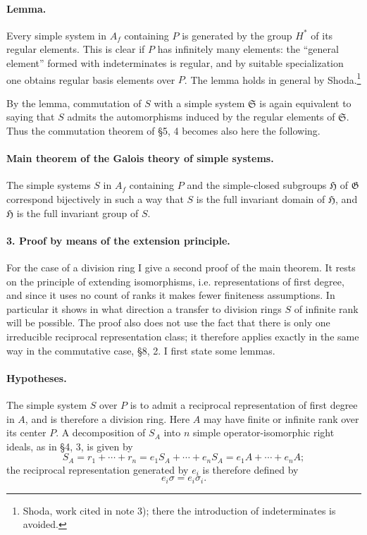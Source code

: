 \documentclass[11pt]{article}
\providecommand{\Gcal}{\mathfrak G}
\begin{document}
\paragraph{Lemma.}
Every simple system in \(A_f\) containing \(P\) is generated by the group \(H^*\) of its regular elements. This is clear if \(P\) has infinitely many elements: the “general element” formed with indeterminates is regular, and by suitable specialization one obtains regular basis elements over \(P\). The lemma holds in general by Shoda.\footnote{Shoda, work cited in note 3); there the introduction of indeterminates is avoided.}

By the lemma, commutation of \(S\) with a simple system \(\mathfrak S\) is again equivalent to saying that \(S\) admits the automorphisms induced by the regular elements of \(\mathfrak S\). Thus the commutation theorem of §5, 4 becomes also here the following.

\paragraph{Main theorem of the Galois theory of simple systems.}
The simple systems \(S\) in \(A_f\) containing \(P\) and the simple-closed subgroups \(\mathfrak H\) of \(\Gcal\) correspond bijectively in such a way that \(S\) is the full invariant domain of \(\mathfrak H\), and \(\mathfrak H\) is the full invariant group of \(S\).

\paragraph{3. Proof by means of the extension principle.}
For the case of a division ring I give a second proof of the main theorem. It rests on the principle of extending isomorphisms, i.e. representations of first degree, and since it uses no count of ranks it makes fewer finiteness assumptions. In particular it shows in what direction a transfer to division rings \(S\) of infinite rank will be possible. The proof also does not use the fact that there is only one irreducible reciprocal representation class; it therefore applies exactly in the same way in the commutative case, §8, 2. I first state some lemmas.

\paragraph{Hypotheses.}
The simple system \(S\) over \(P\) is to admit a reciprocal representation of first degree in \(A\), and is therefore a division ring. Here \(A\) may have finite or infinite rank over its center \(P\). A decomposition of \(S_A\) into \(n\) simple operator-isomorphic right ideals, as in §4, 3, is given by
\[
        S_A=r_1+\cdots+r_n
            =e_1S_A+\cdots+e_nS_A
            =e_1A+\cdots+e_nA ;
\]
the reciprocal representation generated by \(e_i\) is therefore defined by
\[
        e_i\sigma=e_i\sigma_i .
\]
\end{document}
